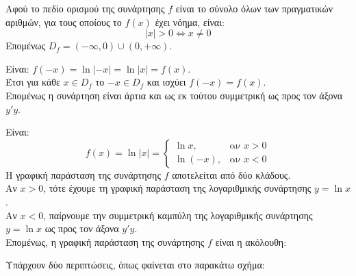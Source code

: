 \begin{alist}
\item Αφού το πεδίο ορισμού της συνάρτησης $f$ είναι το σύνολο όλων των πραγματικών αριθμών, για τους οποίους το $f(x)$ έχει νόημα, είναι:
\[|x| > 0 \Leftrightarrow x \ne 0\]
Επομένως $D_f = (-\infty, 0) \cup (0, +\infty)$.
\item Είναι: $f(-x) = \ln|-x| = \ln|x| = f(x)$. \\
Έτσι για κάθε $x \in D_f$ το $-x \in D_f$ και ισχύει $f(-x) = f(x)$. \\
Επομένως η συνάρτηση είναι άρτια και ως εκ τούτου συμμετρική ως προς τον άξονα $y'y$.
\item Είναι: 
\[f(x) = \ln|x| = \begin{cases} \ln x, & \text{αν } x > 0 \\ \ln(-x), & \text{αν } x < 0 \end{cases}\]
Η γραφική παράσταση της συνάρτησης $f$ αποτελείται από δύο κλάδους. \\
Αν $x > 0$, τότε έχουμε τη γραφική παράσταση της λογαριθμικής συνάρτησης $y = \ln x$. \\
Αν $x < 0$, παίρνουμε την συμμετρική καμπύλη της λογαριθμικής συνάρτησης $y = \ln x$ ως προς τον άξονα $y'y$. \\
Επομένως, η γραφική παράσταση της συνάρτησης $f$ είναι η ακόλουθη:
\begin{center}
\end{center}
\item Υπάρχουν δύο περιπτώσεις, όπως φαίνεται στο παρακάτω σχήμα:
\end{alist}

